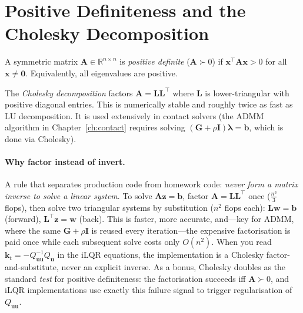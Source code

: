 \documentclass[11pt,twoside]{report}
\theoremstyle{definition}
\theoremstyle{plain}
\theoremstyle{remark}
\newcommand{\R}{\mathbb{R}}
\newcommand{\x}{\bm{x}}
\newcommand{\uu}{\bm{u}}
\newcommand{\0}{\bm{0}}
\newcommand{\I}{\bm{I}}
\begin{document}
\section{Positive Definiteness and the Cholesky Decomposition}

A symmetric matrix $\bm{A}\in\R^{n\times n}$ is \emph{positive definite}
($\bm{A}\succ 0$) if $\x^{\!\top}\bm{A}\x>0$ for all $\x\ne\0$.
Equivalently, all eigenvalues are positive.

The \emph{Cholesky decomposition} factors $\bm{A}=\bm{L}\bm{L}^{\!\top}$
where $\bm{L}$ is lower-triangular with positive diagonal entries.
This is numerically stable and roughly twice as fast as LU decomposition.
It is used extensively in contact solvers (the ADMM algorithm in
Chapter~\ref{ch:contact} requires solving
$(\bm{G}+\rho\bm{I})\bm{\lambda}=\bm{b}$,
which is done via Cholesky).

\paragraph{Why factor instead of invert.}
A rule that separates production code from homework code:
\emph{never form a matrix inverse to solve a linear system}.
To solve $\bm{A}\bm{z}=\bm{b}$, factor $\bm{A}=\bm{L}\bm{L}^{\!\top}$
once ($\tfrac{n^{3}}{3}$ flops), then solve two triangular systems
by substitution ($n^{2}$ flops each):
$\bm{L}\bm{w}=\bm{b}$ (forward), $\bm{L}^{\!\top}\bm{z}=\bm{w}$ (back).
This is faster, more accurate, and---key for ADMM, where the same
$\bm{G}+\rho\I$ is reused every iteration---the expensive factorisation
is paid once while each subsequent solve costs only $O(n^{2})$.
When you read $\bm{k}_{t}=-Q_{\uu\uu}^{-1}Q_{\uu}$ in the iLQR
equations, the implementation is a Cholesky factor-and-substitute,
never an explicit inverse. As a bonus, Cholesky doubles as the standard
\emph{test} for positive definiteness: the factorisation succeeds iff
$\bm{A}\succ 0$, and iLQR implementations use exactly this failure
signal to trigger regularisation of $Q_{\uu\uu}$.
\end{document}
